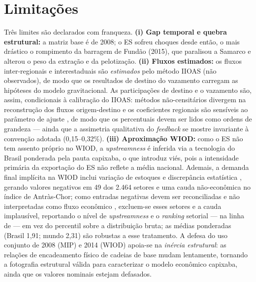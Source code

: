 \documentclass[11pt,a4paper]{article}
\begin{document}
\section{Limitações}
\label{sec:limites}
Três limites são declarados com franqueza. \textbf{(i) Gap temporal e quebra
estrutural:} a matriz base é de 2008; o ES sofreu choques desde então, o mais
drástico o rompimento da barragem de Fundão (2015), que paralisou a Samarco e
alterou o peso da extração e da pelotização. \textbf{(ii) Fluxos estimados:} os
fluxos inter-regionais e interestaduais são \emph{estimados} pelo método IIOAS
(não observados), de modo que os resultados de destino do vazamento carregam as
hipóteses do modelo gravitacional. As participações de destino e o vazamento são, assim,
condicionais à calibração do IIOAS: métodos não-censitários divergem na reconstrução dos
fluxos origem-destino \citep{riddington2006comparison} e os coeficientes regionais são
sensíveis ao parâmetro de ajuste \citep{flegg2016evaluating}, de modo que os percentuais
devem ser lidos como ordens de grandeza --- ainda que a assimetria qualitativa do
\emph{feedback} se mostre invariante à convenção adotada (0,15--0,32\%). \textbf{(iii) Aproximação WIOD:} como o ES
não tem assento próprio no WIOD, a \emph{upstreamness} é inferida via a
tecnologia do Brasil ponderada pela pauta capixaba, o que introduz viés, pois a
intensidade primária da exportação do ES não reflete a média nacional. Ademais,
a demanda final implícita na WIOD inclui variação de estoques e discrepância
estatística \citep{oecd2019tiva}, gerando valores negativos em 49 dos 2.464
setores e uma cauda não-econômica no índice de Antràs-Chor; como entradas
negativas devem ser reconciliadas e não interpretadas como fluxo econômico
\citep{tukker2013global}, excluem-se esses setores e a cauda implausível,
reportando o nível de \emph{upstreamness} e o \emph{ranking} setorial --- na
linha de \citet{araujojunior2018cgv} --- em vez do percentil sobre a
distribuição bruta; as médias ponderadas (Brasil 1,91; mundo 2,31) são robustas
a esse tratamento. A
defesa do uso conjunto de 2008 (MIP) e 2014 (WIOD) apoia-se na \emph{inércia
estrutural}: as relações de encadeamento físico de cadeias de base mudam
lentamente, tornando a fotografia estrutural válida para caracterizar o modelo
econômico capixaba, ainda que os valores nominais estejam defasados.

\end{document}
